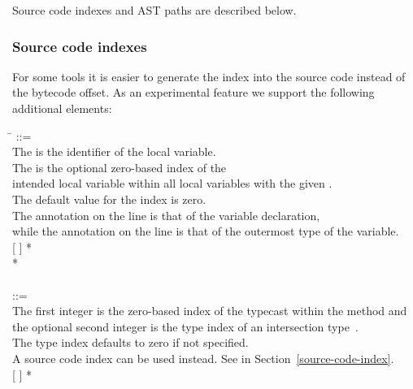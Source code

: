 \documentclass{article}
\begin{document}
Source code indexes and AST paths are described below.

\subsubsection{Source code indexes\label{source-code-index}}

For some tools it is easier to generate the index into the source code
instead of the bytecode offset.
As an experimental feature we support the following additional
elements:


\begin{tabbing}
\qquad \= \kill
{} ::= \\
\qquad    \bnfcmt The  is the identifier of the local variable.\\
\qquad    \bnfcmt The  is the optional zero-based index of the\\
\qquad    \bnfcmt intended local variable within all local variables with the given
.\\
\qquad    \bnfcmt The default value for the index is zero.\\
\qquad    \bnfcmt The annotation on the  line is that of the variable declaration, \\
\qquad    \bnfcmt while the annotation on the  line is that of the outermost type of the variable. \\
\qquad    {}  [\bnflit{*} ] \bnflit{:} * \lineend \\
\qquad    {}* \\
\\
 ::= \\
\qquad    \bnfcmt The first integer is the zero-based index of the
typecast within the method and \\
\qquad    \bnfcmt  the optional second integer is the type index of an intersection type~\cite{JSR308}. \\
\qquad    \bnfcmt The type index defaults to zero if not specified. \\
\qquad    \bnfcmt A source code index can be used instead. See  in Section~\ref{source-code-index}. \\
\qquad    {} \bnflit{*}  [ \bnflit{,}  ] \bnflit{:} * \lineend \\

\end{tabbing}
\end{document}
